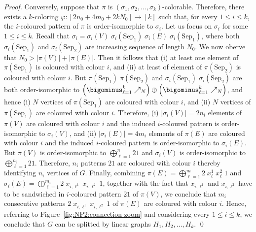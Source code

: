\begin{proof}
  Conversely, suppose that $\pi$ is $(\sigma_1, \sigma_2, \dots, \sigma_k)$-colorable.
  Therefore, there exists a $k$-coloring $\varphi: [2n_0 + 4m_0 + 2kN_0] \to [k]$
  such that, for every $1 \leq i \leq k$,
  the $i$-coloured pattern of $\pi$ is order-isomorphic to $\sigma_i$.
  Let us focus on $\sigma_i$ for some $1 \leq i \leq k$.
  Recall that
  $\sigma_i =
  \sigma_i(V)   \;
  \sigma_i\left(\text{Sep}_1\right) \;
  \sigma_i\left(E\right)   \;
  \sigma_i\left(\text{Sep}_1\right)$,
  where both
  $\sigma_i\left(\text{Sep}_1\right)$ and $\sigma_i\left(\text{Sep}_2\right)$
  are increasing sequence of length $N_0$.
  We now oberve that
  $N_0 > |\pi(V)| + |\pi(E)|$.
  Then it follows that
  (i) at least one element of $\pi(\text{Sep}_1)$ is coloured with
  colour $i$,
  and
  (ii) at least of element of $\pi(\text{Sep}_2)$ is coloured with
  colour $i$.
  But
  $\pi(\text{Sep}_1) \; \pi(\text{Sep}_2)$ and
  $\sigma_i\left(\text{Sep}_1\right) \; \sigma_i\left(\text{Sep}_2\right)$
  are both order-isomorphic to
  $\left(\bigominus_{\ell=1}^{k} \nearrow_N\right) \oplus \left(\bigominus_{\ell=1}^{k} \nearrow_N\right)$,
  and hence
  (i) $N$ vertices of $\pi(\text{Sep}_1)$ are coloured with
  colour $i$,
  and
  (ii) $N$ vertices of $\pi(\text{Sep}_1)$ are coloured with
  colour $i$.
  Therefore,
  (i) $|\sigma_i(V)| = 2n_i$ elements of
  $\pi(V)$ are coloured with colour $i$ and the induced
  $i$-coloured pattern is order-isomorphic to $\sigma_i(V)$,
  and
  (ii) $|\sigma_i\left(E\right)| = 4m_i$ elements of
  $\pi(E)$ are coloured with colour $i$ and the induced
  $i$-coloured pattern is order-isomorphic to $\sigma_i\left(E\right)$.
  But $\pi(V)$ is order-isomorphic to $\bigoplus_{\ell=1}^{n} 21$
  and
  $\sigma_i(V)$ is order-isomorphic to $\bigoplus_{\ell=1}^{n_i} 21$.
  Therefore, $n_i$ patterns $21$ are coloured with colour $i$ thereby identifying
  $n_i$ vertices of $G$.
  Finally,
  combining
  $\pi(E) = \bigoplus_{\ell=1}^{m} 2 \; x_\ell^1 \; x_\ell^2 \; 1$ and
  $\sigma_i\left(E\right) = \bigoplus_{\ell=1}^{m_i} 2 \; x_{i,\ell^1} \; x_{i,\ell^2} \; 1$,
  together with the fact that $x_{i,\ell^1}$ and $x_{i,\ell^2}$ have to be sandwiched in
  $i$-coloured pattern $21$ of $\pi(V)$,
  we conclude that $m_i$ consecutive patterns $2 \; x_{i,\ell^1} \; x_{i,\ell^2} \; 1$
  of $\pi(E)$ are coloured with colour $i$.
  Hence, referring to
  Figure~\ref{fig:NP2:connection zoom} and considering every $1 \leq i \leq k$,
  we conclude that $G$ can be splitted by linear graphs $H_1, H_2, \ldots, H_k$.
  \qed
\end{proof}

